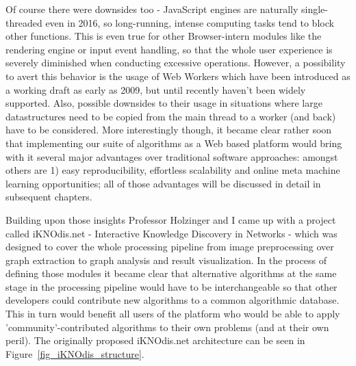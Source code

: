 Of course there were downsides too - JavaScript engines are naturally single-threaded even in 2016, so long-running, intense computing tasks tend to block other functions. This is even true for other Browser-intern modules like the rendering engine or input event handling, so that the whole user experience is severely diminished when conducting excessive operations. However, a possibility to avert this behavior is the usage of Web Workers which have been introduced as a working draft as early as 2009, but until recently haven't been widely supported. Also, possible downsides to their usage in situations where large datastructures need to be copied from the main thread to a worker (and back) have to be considered. More interestingly though, it became clear rather soon that implementing our suite of algorithms as a Web based platform would bring with it several major advantages over traditional software approaches: amongst others are 1) easy reproducibility, effortless scalability and online meta machine learning opportunities; all of those advantages will be discussed in detail in subsequent chapters.

Building upon those insights Professor Holzinger and I came up with a project called iKNOdis.net - Interactive Knowledge Discovery in Networks - which was designed to cover the whole processing pipeline from image preprocessing over graph extraction to graph analysis and result visualization. In the process of defining those modules it became clear that alternative algorithms at the same stage in the processing pipeline would have to be interchangeable so that other developers could contribute new algorithms to a common algorithmic database. This in turn would benefit all users of the platform who would be able to apply 'community'-contributed algorithms to their own problems (and at their own peril). The originally proposed iKNOdis.net architecture can be seen in Figure~\ref{fig_iKNOdis_structure}.

